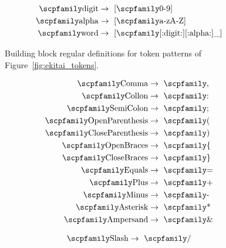 \documentclass[
  oneside,
  english,
  coorientadorbanca,
  noabntexcite
]{ufsc-thesis-rn46-2019}
\newcommand{\code}[1]{\text{\scpfamily\setlength\spaceskip{0.35em}#1}}
\begin{document}
\begin{figure}[ht]
  \small
  \begin{align*}
    \code{digit} & \rightarrow \ [\code{0-9}]                  \\
    \code{alpha} & \rightarrow \ [\code{a-zA-Z}]               \\
    \code{word}  & \rightarrow \ [\code{[:digit:][:alpha:]\_}]
  \end{align*}
  \caption{
    Building block regular definitions for token patterns of Figure~\ref{fig:ekitai_tokens}.
  }\label{fig:ekitai_tokens_helper}
\end{figure}
\begin{figure}[ht]
  \centering
  \begin{subfigure}[b]{0.3\textwidth}
    \small
    \begin{minipage}{\textwidth}
      \begin{align*}
        \code{Comma}            & \rightarrow \ \code{,}  \\
        \code{Collon}           & \rightarrow \ \code{:}  \\
        \code{SemiColon}        & \rightarrow \ \code{;}  \\
        \code{OpenParenthesis}  & \rightarrow \ \code{(}  \\
        \code{CloseParenthesis} & \rightarrow \ \code{)}  \\
        \code{OpenBraces}       & \rightarrow \ \code{\{} \\
        \code{CloseBraces}      & \rightarrow \ \code{\}} \\
        \code{Equals}           & \rightarrow \ \code{=}  \\
        \code{Plus}             & \rightarrow \ \code{+}  \\
        \code{Minus}            & \rightarrow \ \code{-}  \\
        \code{Asterisk}         & \rightarrow \ \code{*}  \\
        \code{Ampersand}        & \rightarrow \ \code{\&}
      \end{align*}
    \end{minipage}
  \end{subfigure}
  \begin{subfigure}[b]{0.3\textwidth}
    \begin{minipage}{\textwidth}
      \small
      \begin{align*}
        \code{Slash}             & \rightarrow \ \code{/}    \\

\end{align*}
\end{minipage}
\end{subfigure}
\end{figure}
\end{document}
